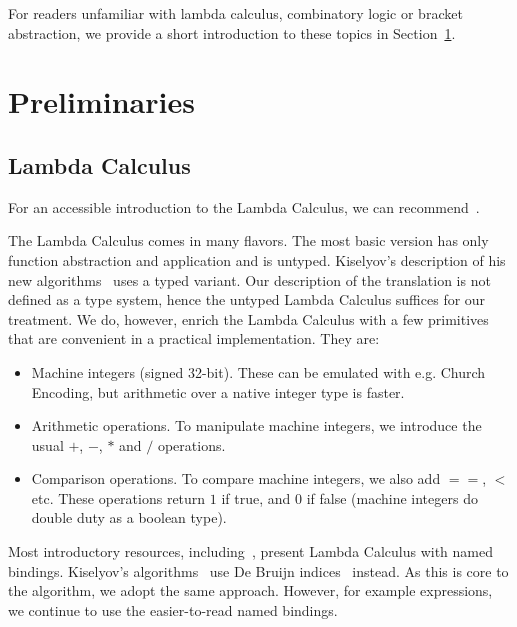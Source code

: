 \documentclass[conference]{IEEEtran}
\begin{document}
For readers unfamiliar with lambda calculus, combinatory logic or bracket abstraction, we provide a short introduction to these topics in Section~\ref{sec:prelim}.

\section{Preliminaries}
\label{sec:prelim}
\subsection{Lambda Calculus}
For an accessible introduction to the Lambda Calculus, we can recommend~\cite{rojas_tutorial_2015}.

The Lambda Calculus comes in many flavors.
The most basic version has only function abstraction and application and is untyped.
Kiselyov's description of his new algorithms~\cite{kiselyov_lambda_2018} uses a typed variant.
Our description of the translation is not defined as a type system, hence the untyped Lambda Calculus suffices for our treatment.
We do, however, enrich the Lambda Calculus with a few primitives that are convenient in a practical implementation. They are:
\begin{itemize}
    \item Machine integers (signed 32-bit). These can be emulated with e.g. Church Encoding, but arithmetic over a native integer type is faster.
    \item Arithmetic operations. To manipulate machine integers, we introduce the usual $+$, $-$, $*$ and $/$ operations.
    \item Comparison operations. To compare machine integers, we also add $==$, $<$ etc. These operations return $1$ if true, and $0$ if false (machine integers do double duty as a boolean type).
\end{itemize}

Most introductory resources, including~\cite{rojas_tutorial_2015}, present Lambda Calculus with named bindings.
Kiselyov's algorithms~\cite{kiselyov_lambda_2018} use De Bruijn indices~\cite{de_bruijn_lambda_1972} instead.
As this is core to the algorithm, we adopt the same approach.
However, for example expressions, we continue to use the easier-to-read named bindings.
\end{document}
